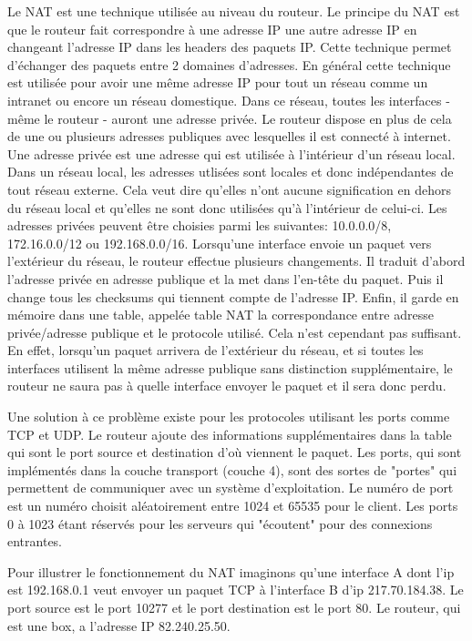 \begin{itemize}
Le NAT est une technique utilisée au niveau du routeur. Le principe du NAT est
que le routeur fait correspondre à une adresse IP une autre adresse IP en
changeant l'adresse IP dans les headers des paquets IP. Cette technique permet
d'échanger des paquets entre 2 domaines d'adresses. En général cette technique
est utilisée pour avoir une même adresse IP pour tout un réseau comme un 
intranet ou encore un réseau domestique. Dans ce réseau, toutes les interfaces
- même le routeur - auront une adresse privée. Le routeur dispose en plus de
cela de une ou plusieurs adresses publiques avec lesquelles il est connecté à
internet. Une adresse privée est une adresse qui est utilisée à l'intérieur
d'un réseau local. Dans un réseau local, les adresses utlisées sont locales et donc
indépendantes de tout réseau externe. Cela veut dire qu'elles n'ont aucune
signification en dehors du réseau local et qu'elles ne sont donc utilisées qu'à
l'intérieur de celui-ci. Les adresses privées peuvent être choisies parmi les
suivantes: 10.0.0.0/8, 172.16.0.0/12 ou 192.168.0.0/16.
\smallbreak
Lorsqu'une interface envoie un paquet vers l'extérieur du réseau, le routeur
effectue plusieurs changements. Il traduit d'abord l'adresse privée en adresse
publique et la met dans l'en-tête du paquet. Puis il change tous les checksums
qui tiennent compte de l'adresse IP. Enfin, il garde en mémoire dans une table,
 appelée table NAT la correspondance entre adresse privée/adresse publique et le
protocole utilisé.
\newline
Cela n'est cependant pas suffisant. En effet, lorsqu'un paquet arrivera de
l'extérieur du réseau, et si toutes les interfaces utilisent la même adresse
publique sans distinction supplémentaire, le routeur ne saura pas à quelle
interface envoyer le paquet et il sera donc perdu.

Une solution à ce problème existe pour les protocoles utilisant les ports comme
TCP et UDP. Le routeur ajoute des informations supplémentaires dans la table qui
sont le port source et destination d'où viennent le paquet. Les ports, qui sont implémentés dans
la couche transport (couche 4), sont des sortes de "portes" qui permettent de
communiquer avec un système d'exploitation. Le numéro de port est un numéro
choisit aléatoirement entre 1024 et 65535 pour le client. Les ports 0 à 1023 étant réservés
pour les serveurs qui "écoutent" pour des connexions entrantes.

\newline
Pour illustrer le fonctionnement du NAT imaginons qu'une interface A dont l'ip
est 192.168.0.1 veut envoyer un paquet TCP à l'interface B d'ip 217.70.184.38.
Le port source est le port 10277 et le port destination est le port 80. Le
routeur, qui est une box, a l'adresse IP  82.240.25.50.


\end{itemize}
